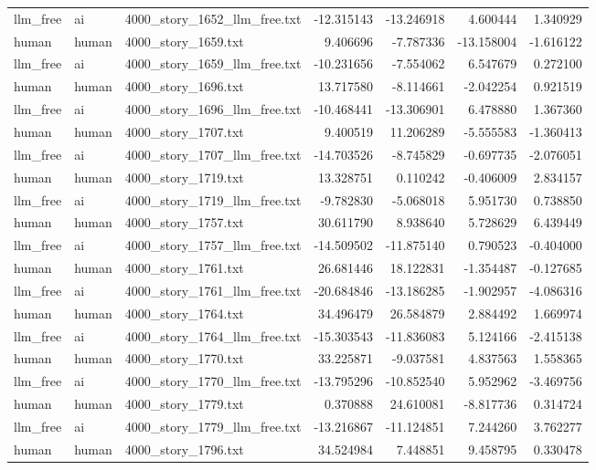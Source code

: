 \begin{longtable}{lllrrrr}
llm\_free & ai & 4000\_story\_1652\_llm\_free.txt & -12.315143 & -13.246918 & 4.600444 & 1.340929 \\
human & human & 4000\_story\_1659.txt & 9.406696 & -7.787336 & -13.158004 & -1.616122 \\
llm\_free & ai & 4000\_story\_1659\_llm\_free.txt & -10.231656 & -7.554062 & 6.547679 & 0.272100 \\
human & human & 4000\_story\_1696.txt & 13.717580 & -8.114661 & -2.042254 & 0.921519 \\
llm\_free & ai & 4000\_story\_1696\_llm\_free.txt & -10.468441 & -13.306901 & 6.478880 & 1.367360 \\
human & human & 4000\_story\_1707.txt & 9.400519 & 11.206289 & -5.555583 & -1.360413 \\
llm\_free & ai & 4000\_story\_1707\_llm\_free.txt & -14.703526 & -8.745829 & -0.697735 & -2.076051 \\
human & human & 4000\_story\_1719.txt & 13.328751 & 0.110242 & -0.406009 & 2.834157 \\
llm\_free & ai & 4000\_story\_1719\_llm\_free.txt & -9.782830 & -5.068018 & 5.951730 & 0.738850 \\
human & human & 4000\_story\_1757.txt & 30.611790 & 8.938640 & 5.728629 & 6.439449 \\
llm\_free & ai & 4000\_story\_1757\_llm\_free.txt & -14.509502 & -11.875140 & 0.790523 & -0.404000 \\
human & human & 4000\_story\_1761.txt & 26.681446 & 18.122831 & -1.354487 & -0.127685 \\
llm\_free & ai & 4000\_story\_1761\_llm\_free.txt & -20.684846 & -13.186285 & -1.902957 & -4.086316 \\
human & human & 4000\_story\_1764.txt & 34.496479 & 26.584879 & 2.884492 & 1.669974 \\
llm\_free & ai & 4000\_story\_1764\_llm\_free.txt & -15.303543 & -11.836083 & 5.124166 & -2.415138 \\
human & human & 4000\_story\_1770.txt & 33.225871 & -9.037581 & 4.837563 & 1.558365 \\
llm\_free & ai & 4000\_story\_1770\_llm\_free.txt & -13.795296 & -10.852540 & 5.952962 & -3.469756 \\
human & human & 4000\_story\_1779.txt & 0.370888 & 24.610081 & -8.817736 & 0.314724 \\
llm\_free & ai & 4000\_story\_1779\_llm\_free.txt & -13.216867 & -11.124851 & 7.244260 & 3.762277 \\
human & human & 4000\_story\_1796.txt & 34.524984 & 7.448851 & 9.458795 & 0.330478 \\

\end{longtable}

